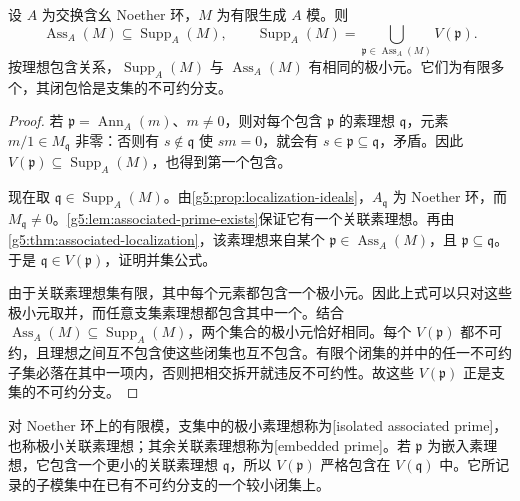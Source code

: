 \begin{corollary}\label{g5:cor:minimal-support-associated}
	设 \(A\) 为交换含幺 Noether 环，\(M\) 为有限生成 \(A\) 模。则
	\[
		\operatorname{Ass}_A(M)\subseteq\operatorname{Supp}_A(M),\qquad
		\operatorname{Supp}_A(M)=
		\bigcup_{\mathfrak p\in\operatorname{Ass}_A(M)}V(\mathfrak p).
	\]
	按理想包含关系，\(\operatorname{Supp}_A(M)\) 与 \(\operatorname{Ass}_A(M)\) 有相同的极小元。它们为有限多个，其闭包恰是支集的不可约分支。
\end{corollary}
\begin{proof}
	若 \(\mathfrak p=\operatorname{Ann}_A(m)\)、\(m\ne0\)，则对每个包含 \(\mathfrak p\) 的素理想 \(\mathfrak q\)，元素 \(m/1\in M_{\mathfrak q}\) 非零：否则有 \(s\notin\mathfrak q\) 使 \(sm=0\)，就会有 \(s\in\mathfrak p\subseteq\mathfrak q\)，矛盾。因此 \(V(\mathfrak p)\subseteq\operatorname{Supp}_A(M)\)，也得到第一个包含。

	现在取 \(\mathfrak q\in\operatorname{Supp}_A(M)\)。由\cref{g5:prop:localization-ideals}，\(A_{\mathfrak q}\) 为 Noether 环，而 \(M_{\mathfrak q}\ne0\)。\cref{g5:lem:associated-prime-exists}保证它有一个关联素理想。再由\cref{g5:thm:associated-localization}，该素理想来自某个 \(\mathfrak p\in\operatorname{Ass}_A(M)\)，且 \(\mathfrak p\subseteq\mathfrak q\)。于是 \(\mathfrak q\in V(\mathfrak p)\)，证明并集公式。

	由于关联素理想集有限，其中每个元素都包含一个极小元。因此上式可以只对这些极小元取并，而任意支集素理想都包含其中一个。结合 \(\operatorname{Ass}_A(M)\subseteq\operatorname{Supp}_A(M)\)，两个集合的极小元恰好相同。每个 \(V(\mathfrak p)\) 都不可约，且理想之间互不包含使这些闭集也互不包含。有限个闭集的并中的任一不可约子集必落在其中一项内，否则把相交拆开就违反不可约性。故这些 \(V(\mathfrak p)\) 正是支集的不可约分支。
\end{proof}

对 Noether 环上的有限模，支集中的极小素理想称为[isolated associated prime]，也称极小关联素理想；其余关联素理想称为[embedded prime]。若 \(\mathfrak p\) 为嵌入素理想，它包含一个更小的关联素理想 \(\mathfrak q\)，所以 \(V(\mathfrak p)\) 严格包含在 \(V(\mathfrak q)\) 中。它所记录的子模集中在已有不可约分支的一个较小闭集上。

